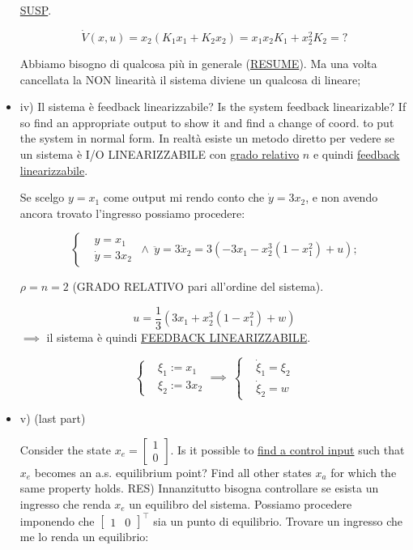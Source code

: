 \begin{itemize}
\underline{SUSP}.

\[
	\dot{V}(x,u) = x_2(K_1x_1+K_2x_2) = x_1x_2K_1 + x_2^2K_2 = ?
\]

Abbiamo bisogno di qualcosa più in generale (\underline{RESUME}). Ma una volta cancellata la NON linearità il sistema diviene un qualcosa di lineare;

\item{iv)} Il sistema è feedback linearizzabile? Is the system feedback linearizable? If so find an appropriate output to show it and find a change of coord. to put the system in normal form. In realtà esiste un metodo diretto per vedere se un sistema è I/O LINEARIZZABILE con \underline{grado relativo} $n$ e quindi \underline{feedback linearizzabile}.

Se scelgo $y=x_1$ come output mi rendo conto che $\dot{y}=3x_2$, e non avendo ancora trovato l'ingresso possiamo procedere:

\[
	\left\{
	\begin{aligned}
	&y=x_1\\
	&\dot{y}=3x_2
	\end{aligned}
	\right.\ \land\ \ddot{y}=3\dot{x}_2= 3(-3x_1 - x_2^3(1-x_1^2) + u);
\]

$\rho=n=2$ (GRADO RELATIVO pari all'ordine del sistema).

\[
	u = \frac{1}{3}(3x_1+x_2^3(1-x_1^2) +w)
\]
$\implies$ il sistema è quindi \underline{FEEDBACK LINEARIZZABILE}.

\[
	\left\{
	\begin{aligned}
	&\xi_1 := x_1\\
	&\xi_2 := 3x_2
	\end{aligned}
	\right. \implies\ 
	\left\{
	\begin{aligned}
	&\dot{\xi}_1 = \xi_2\\
	&\dot{\xi}_2 = w
	\end{aligned}
	\right.
\]

\item{v) (last part)}

Consider the state $x_e = \begin{bmatrix}1\\0\end{bmatrix}$. Is it possible to \underline{find a control input} such that $x_e$ becomes an a.s. equilibrium point? Find all other states $x_a$ for which the same property holds.
RES) Innanzitutto bisogna controllare se esista un ingresso che renda $x_e$ un equilibro del sistema. Possiamo procedere imponendo che $\begin{bmatrix}1&0\end{bmatrix}^\top$ sia un punto di equilibrio. Trovare un ingresso che me lo renda un equilibrio:


\end{itemize}
